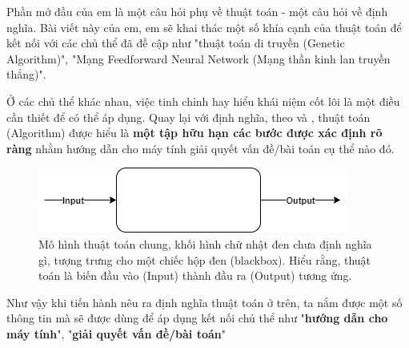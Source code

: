 Phần mở đầu của em là một câu hỏi phụ về thuật toán - một câu hỏi về định nghĩa. Bài viết này của em, em sẽ khai thác một số khía cạnh của thuật toán để kết nối với các chủ thể đã đề cập như "thuật toán di truyền (Genetic Algorithm)", "Mạng Feedforward Neural Network (Mạng thần kinh lan truyền thẳng)".

Ở các chủ thể khác nhau, việc tinh chỉnh hay hiểu khái niệm cốt lõi là một điều cần thiết để có thể áp dụng. Quay lại với định nghĩa, theo \cite{algorithmDefinition1} và \cite{algorithmDefinition2}, thuật toán (Algorithm) được hiểu là \textbf{một tập hữu hạn các bước được xác định rõ ràng} nhằm hướng dẫn cho máy tính giải quyết vấn đề/bài toán cụ thể nào đó.

\begin{figure}[h]
	\centering
	\includegraphics{figures/general_algorithm_diagram.png}
	\caption{Mô hình thuật toán chung, khối hình chữ nhật đen chưa định nghĩa gì, tượng trưng cho một chiếc hộp đen (blackbox). Hiểu rằng, thuật toán là biến đầu vào (Input) thành đầu ra (Output) tương ứng.}
	\label{fig:algorithm_architect_general}
\end{figure}

Như vậy khi tiến hành nêu ra định nghĩa thuật toán ở trên, ta nắm được một số thông tin mà sẽ được dùng để áp dụng kết nối chủ thể như "\textbf{hướng dẫn cho máy tính}", "\textbf{giải quyết vấn đề/bài toán}"

